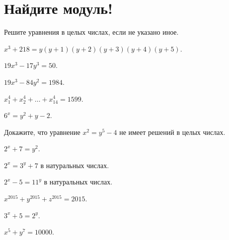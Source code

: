 
\section*{Найдите модуль!}


Решите уравнения в целых числах, если не указано иное.

\begin{problems}

\item
$x^3 + 218 = y (y + 1) (y + 2) (y + 3) (y + 4) (y + 5)$.

\item
$19 x^3 - 17 y^3 = 50$.

\item
$19 x^3 - 84 y^2 = 1984$.

\item
$x_{1}^4 + x_{2}^4 + \ldots + x_{14}^4 = 1599$.

\item
$6^x = y^2 + y - 2$.

\item
Докажите, что уравнение\enspace
$x^2 = y^5 - 4$\enspace
не имеет решений в целых числах.

\item
$2^x + 7 = y^2$.

\item
$2^x = 3^y + 7$\enspace
в натуральных числах.

\item
$2^x - 5 = 11^y$\enspace
в натуральных числах.

\item
$x^{2015} + y^{2015} + z^{2015} = 2015$.

\item
$3^x + 5 = 2^y$.

\item
$x^5 + y^7 = 10000$.

\end{problems}

